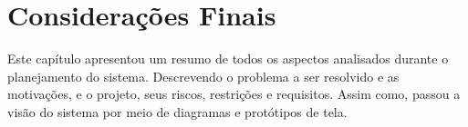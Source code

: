 \newpage

\section{Considerações Finais}

Este capítulo apresentou um resumo de todos os aspectos analisados durante o planejamento do sistema.
Descrevendo o problema a ser resolvido e as motivações, e o projeto, seus riscos, restrições e requisitos.
Assim como, passou a visão do sistema por meio de diagramas e protótipos de tela.